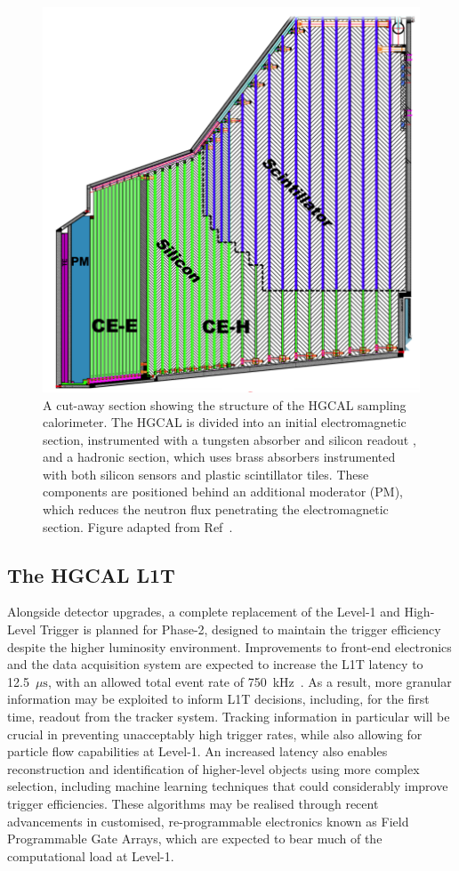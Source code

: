 \begin{figure}[htbp!]
\centering
\includegraphics[width =0.5\linewidth]{Figures/Detector/HGCAL/Misc/HGCAL.png}\hfill
\caption[The CMS High Granularity Calorimeter.]{A cut-away section showing the structure of the HGCAL sampling calorimeter. The HGCAL is divided into an initial electromagnetic section, instrumented with a tungsten absorber and silicon readout , and a hadronic section, which uses brass absorbers instrumented with both silicon sensors and plastic scintillator tiles. These components are positioned behind an additional moderator (PM), which reduces the neutron flux penetrating the electromagnetic section. Figure adapted from Ref~\cite{CMS_phase2_HGCAL}.}%
\label{fig:cms_HGCAL}
\end{figure}



\subsection{The HGCAL L1T}

Alongside detector upgrades, a complete replacement of the Level-1 and High-Level Trigger is planned for Phase-2, designed to maintain the trigger efficiency despite the higher luminosity environment. Improvements to front-end electronics and the data acquisition system are expected to increase the L1T latency to 12.5~$\mu\mathrm{s}$, with an allowed total event rate of 750~kHz~\cite{CMS_phase2_L1T}. As a result, more granular information may be exploited to inform L1T decisions, including, for the first time, readout from the tracker system. Tracking information in particular will be crucial in preventing unacceptably high trigger rates, while also allowing for particle flow capabilities at Level-1. An increased latency also enables reconstruction and identification of higher-level objects using more complex selection, including machine learning techniques that could considerably improve trigger efficiencies. These algorithms may be realised through recent advancements in customised, re-programmable electronics known as Field Programmable Gate Arrays, which are expected to bear much of the computational load at Level-1.

